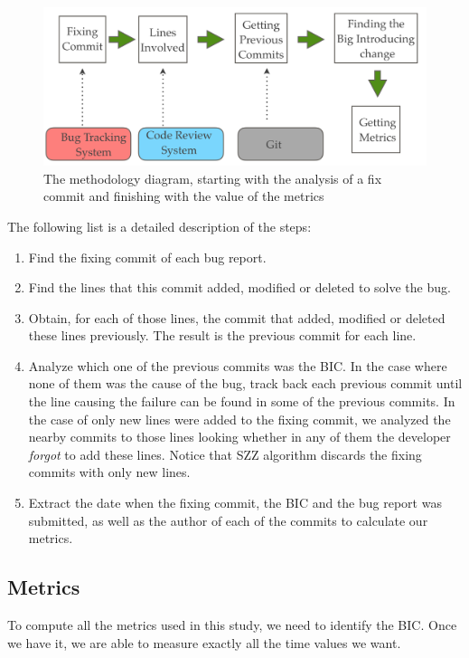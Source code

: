 \documentclass[10pt, conference]{IEEEtran}
\begin{document}
\begin{figure}[ht]
\centering
\includegraphics[width=\columnwidth]{methodology.png}
\caption{The methodology diagram, starting with the analysis of a fix commit and finishing with the value of the metrics}
\label{fig:methodology}       %
\end{figure}

The following list is a detailed description of the steps: 

\begin{enumerate}
		\item Find the fixing commit of each bug report.
		\item Find the lines that this commit added, modified or deleted to solve the bug.
		\item Obtain, for each of those lines, the commit that added, modified or deleted these lines previously. The result is the previous commit for each line.
		\item Analyze which one of the previous commits was the BIC. In the case where none of them was the cause of the bug, track back each previous commit until the line causing the failure can be found in some of the previous commits. In the case of only new lines were added to the fixing commit, we analyzed the nearby commits to those lines looking whether in any of them the developer \emph{forgot} to add these lines. Notice that SZZ algorithm discards the fixing commits with only new lines.
		\item Extract the date when the fixing commit, the BIC and the bug report was submitted, as well as the author of each of the commits to calculate our metrics.	
\end{enumerate} 


\subsection{Metrics}

To compute all the metrics used in this study, we need to identify the BIC. Once we have it, we are able to measure exactly all the time values we want.  
\end{document}
